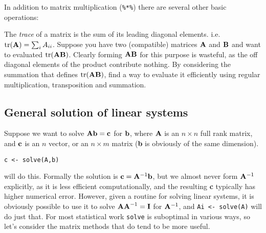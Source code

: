 \documentclass[10pt] {article}
\newcommand{\ts}{^{\rm T}}
\theoremstyle{definition}
\begin{document}
In addition to matrix multiplication (\lstinline+%*%+) there are several other basic operations:

 The {\em  trace} of a matrix is the sum of its leading diagonal elements. i.e. $\text{tr}({\bf A}) = \sum_i A_{ii}$. Suppose you have two (compatible) matrices $\bf A$ and $\bf B$ and want to evaluated $\text{tr}({\bf AB})$. Clearly forming $\bf AB$ for this purpose is wasteful, as the off diagonal elements of the product contribute nothing. By considering the summation that defines $\text{tr}({\bf AB})$, find a way to evaluate it efficiently using regular multiplication, transposition and summation.  



\subsection{General solution of linear systems}

Suppose we want to solve ${\bf Ab} = {\bf c}$ for $\bf b$, where $\bf A$ is an $n \times n$ full rank matrix, and $\bf c$ is an $n $ vector, or an $n \times m$ matrix ({\bf b} is obviously of the same dimension).
\begin{lstlisting}
c <- solve(A,b)
\end{lstlisting} 
will do this. Formally the solution is ${\bf c}={\bf A}^{-1}{\bf b}$, but we almost never form ${\bf A}^{-1}$ explicitly, as it is less efficient computationally, and the resulting {\bf c} typically has higher numerical error. However, given a routine for solving linear systems, it is obviously possible to use it to solve ${\bf AA}^{-1} = {\bf I} $ for ${\bf A}^{-1}$, and \lstinline+Ai <- solve(A)+ will do just that. For most statistical work {\tt solve} is suboptimal in various ways, so let's consider the matrix methods that do tend to be more useful.  
\end{document}
